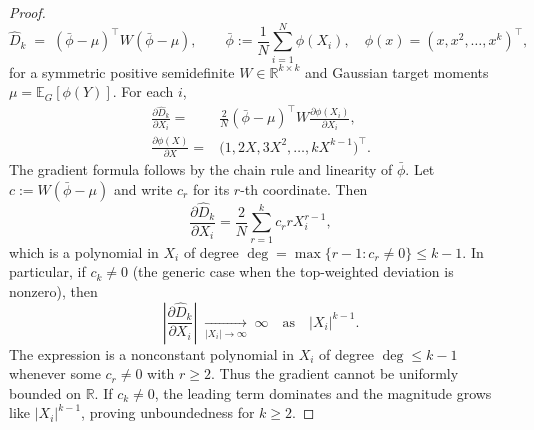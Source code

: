 \begin{proof}
\[
\widehat{D}_k
\;=\;
(\bar{\phi}-\mu)^\top W(\bar{\phi}-\mu),\qquad
\bar{\phi}:=\frac{1}{N}\sum_{i=1}^N \phi(X_i),\quad
\phi(x)=(x,x^2,\dots,x^k)^\top,
\]
for a symmetric positive semidefinite $W\in\mathbb{R}^{k\times k}$ and Gaussian target moments $\mu=\mathbb{E}_G[\phi(Y)]$. For each $i$,
\begin{align*}
\frac{\partial \widehat{D}_k}{\partial X_i}
=& \frac{2}{N}(\bar{\phi}-\mu)^\top W\frac{\partial \phi(X_i)}{\partial X_i},\\
\frac{\partial \phi(X)}{\partial X}
=& \big(1,2X,3X^2,\dots,k X^{k-1}\big)^\top.
\end{align*}
The gradient formula follows by the chain rule and linearity of $\bar{\phi}$. Let $c:=W(\bar{\phi}-\mu)$ and write $c_r$ for its $r$-th coordinate. Then
\[
\frac{\partial \widehat{D}_k}{\partial X_i}
= \frac{2}{N}\sum_{r=1}^k c_rrX_i^{r-1},
\]
which is a polynomial in $X_i$ of degree $\deg=\max\{r-1: c_r\neq 0\}\le k-1$. In particular, if $c_k\neq 0$ (the generic case when the top-weighted deviation is nonzero), then
\[
\left|\frac{\partial \widehat{D}_k}{\partial X_i}\right|
\;\xrightarrow[|X_i|\to\infty]{}\; \infty
\quad\text{as}\quad |X_i|^{k-1}.
\]
The expression is a nonconstant polynomial in $X_i$ of degree $\deg\le k-1$ whenever some $c_r\neq 0$ with $r\ge 2$. Thus the gradient cannot be uniformly bounded on $\mathbb{R}$. If $c_k\neq 0$, the leading term dominates and the magnitude grows like $|X_i|^{k-1}$, proving unboundedness for $k\ge 2$.
\end{proof}



